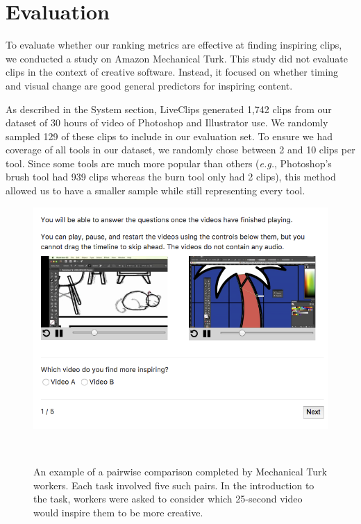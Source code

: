 \section{Evaluation}
\label{sec:liveclips_eval}
To evaluate whether our ranking metrics are effective at finding inspiring clips, we conducted a study on Amazon Mechanical Turk. This study did not evaluate clips in the context of creative software. Instead, it focused on whether timing and visual change are good general predictors for inspiring content. 

As described in the System section, LiveClips generated 1,742 clips from our dataset of 30 hours of video of Photoshop and Illustrator use. We randomly sampled 129 of these clips to include in our evaluation set. To ensure we had coverage of all tools in our dataset, we randomly chose between 2 and 10 clips per tool. Since some tools are much more popular than others (\textit{e.g.}, Photoshop's brush tool had 939 clips whereas the burn tool only had 2 clips), this method allowed us to have a smaller sample while still representing every tool.

\begin{figure}[t!]
\centering
  \includegraphics[width=0.8\columnwidth]{liveclips/figures/mturk.png}
  \caption{An example of a pairwise comparison completed by Mechanical Turk workers. Each task involved five such pairs. In the introduction to the task, workers were asked to consider which 25-second video would inspire them to be more creative. }~\label{fig:liveclips_mturk}
\end{figure}

